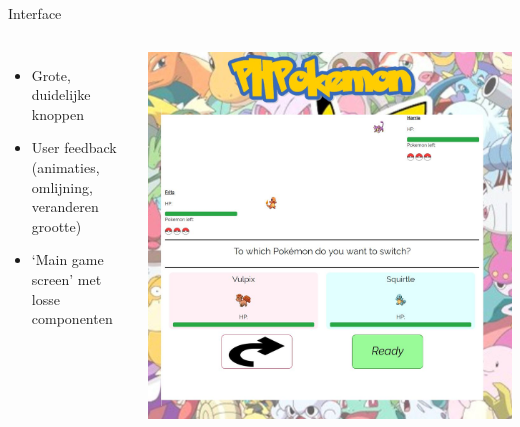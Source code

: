\documentclass{beamer}
\begin{document}
\begin{frame}{Interface}
	\begin{columns}
			\begin{itemize}
				\item Grote, duidelijke knoppen
				\item User feedback \\(animaties, omlijning, veranderen grootte)
				\item `Main game screen' met losse componenten
			\end{itemize}
			\includegraphics[scale=0.2]{Images/screenshot4.jpg}
	\end{columns}
\end{frame}

\end{document}
